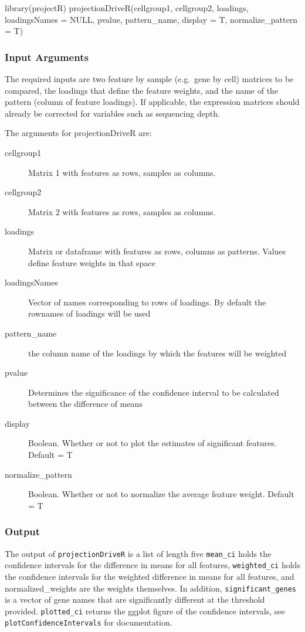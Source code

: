 \documentclass[]{article}
\renewenvironment{verbatim}{\color{codecolor}\begin{myshaded}\begin{oldverbatim}}{\end{oldverbatim}\end{myshaded}}
\begin{document}
\begin{verbatim}
library(projectR)
projectionDriveR(cellgroup1, cellgroup2, loadings, loadingsNames = NULL,
                 pvalue, pattern_name, display = T, normalize_pattern = T)
\end{verbatim}

\hypertarget{input-arguments-5}{%
\subsubsection{Input Arguments}\label{input-arguments-5}}

The required inputs are two feature by sample (e.g.~gene by cell) matrices to be compared, the loadings that define the feature weights, and the name of the pattern (column of feature loadings). If applicable, the expression matrices should already be corrected for variables such as sequencing depth.

The arguments for projectionDriveR are:

\begin{description}
\item[cellgroup1]{Matrix 1 with features as rows, samples as columns.}
\item[cellgroup2]{Matrix 2 with features as rows, samples as columns.}
\item[loadings]{Matrix or dataframe with features as rows, columns as patterns. Values define feature weights in that space}
\item[loadingsNames]{Vector of names corresponding to rows of loadings. By default the rownames of loadings will be used}
\item[pattern\_name]{the column name of the loadings by which the features will be weighted}
\item[pvalue]{Determines the significance of the confidence interval to be calculated between the difference of means}
\item[display]{Boolean. Whether or not to plot the estimates of significant features. Default = T}
\item[normalize\_pattern]{Boolean. Whether or not to normalize the average feature weight. Default = T}
\end{description}

\hypertarget{output-5}{%
\subsubsection{Output}\label{output-5}}

The output of \texttt{projectionDriveR} is a list of length five \texttt{mean\_ci} holds the confidence intervals for the difference in means for all features, \texttt{weighted\_ci} holds the confidence intervals for the weighted difference in means for all features, and normalized\_weights are the weights themselves. In addition, \texttt{significant\_genes} is a vector of gene names that are significantly different at the threshold provided. \texttt{plotted\_ci} returns the ggplot figure of the confidence intervals, see \texttt{plotConfidenceIntervals} for documentation.
\end{document}
